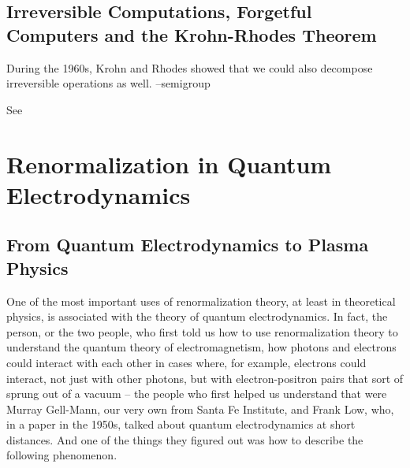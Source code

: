 \documentclass[]{article}
\begin{document}
\subsection{Irreversible Computations, Forgetful Computers and the Krohn-Rhodes Theorem }

During the 1960s, Krohn and Rhodes showed that we could also decompose irreversible operations as well.  --semigroup

See \cite{dedeo2011effective,maler2010krohn,rhodes2009applications}

\section{Renormalization in Quantum Electrodynamics}

\subsection{From Quantum Electrodynamics to Plasma Physics }

One of the most important uses of renormalization theory, at least in theoretical physics, is associated with the theory of quantum electrodynamics.
In fact, the person, or the two people,
who first told us
how to use renormalization theory
to understand the quantum theory
of electromagnetism,
how photons and electrons
could interact with each other
in cases where, for example,
electrons could interact,
not just with other photons,
but with electron-positron pairs
that sort of sprung out of a vacuum –
the people who first helped us
understand that
were Murray Gell-Mann,
our very own from Santa Fe Institute,
and Frank Low,
who, in a paper in the 1950s,
talked about quantum electrodynamics
at short distances.
And one of the things they figured out
was how to describe
the following phenomenon.
\end{document}
